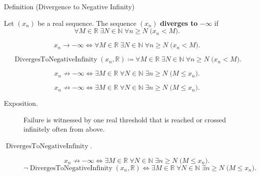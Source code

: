 
\begin{definitionbox}{Definition (Divergence to Negative Infinity)}
\begin{definition}
\label{def:diverges-to-negative-infinity}
Let $(x_n)$ be a real sequence. The sequence $(x_n)$ \textbf{diverges to}
$-\infty$ if
\[
  \forall M\in\mathbb{R}\;\exists N\in\mathbb{N}\;\forall n\ge N
  \;\bigl(x_n<M\bigr).
\]
\end{definition}
\end{definitionbox}

\begin{remark*}
\[
x_n\to-\infty
\Longleftrightarrow
\forall M\in\mathbb{R}\;\exists N\in\mathbb{N}\;\forall n\ge N
\;\bigl(x_n<M\bigr).
\]
\end{remark*}

\begin{remark*}
\[
\operatorname{DivergesToNegativeInfinity}(x_n,\mathbb{R})
\coloneqq
\forall M\in\mathbb{R}\;\exists N\in\mathbb{N}\;\forall n\ge N
\;\bigl(x_n<M\bigr).
\]
\end{remark*}

\begin{remark*}
\[
x_n\not\to-\infty
\Longleftrightarrow
\exists M\in\mathbb{R}\;\forall N\in\mathbb{N}\;\exists n\ge N
\;\bigl(M\le x_n\bigr).
\]
\end{remark*}

\begin{remark*}
\[
x_n\not\to-\infty
\Longleftrightarrow
\exists M\in\mathbb{R}\;\forall N\in\mathbb{N}\;\exists n\ge N
\;\bigl(M\le x_n\bigr).
\]
\end{remark*}



\begin{remark*}
\begin{description}
  \item[Exposition.]
Failure is witnessed by one real threshold that is reached or crossed
infinitely often from above.
  \item[\(\operatorname{DivergesToNegativeInfinity}.\)]
\[
x_n\not\to-\infty
\Longleftrightarrow
\exists M\in\mathbb{R}\;\forall N\in\mathbb{N}\;\exists n\ge N
\;\bigl(M\le x_n\bigr).
\]
\[
\neg\operatorname{DivergesToNegativeInfinity}(x_n,\mathbb{R})
\Longleftrightarrow
\exists M\in\mathbb{R}\;\forall N\in\mathbb{N}\;\exists n\ge N
\;\bigl(M\le x_n\bigr).
\]
\end{description}
\end{remark*}

